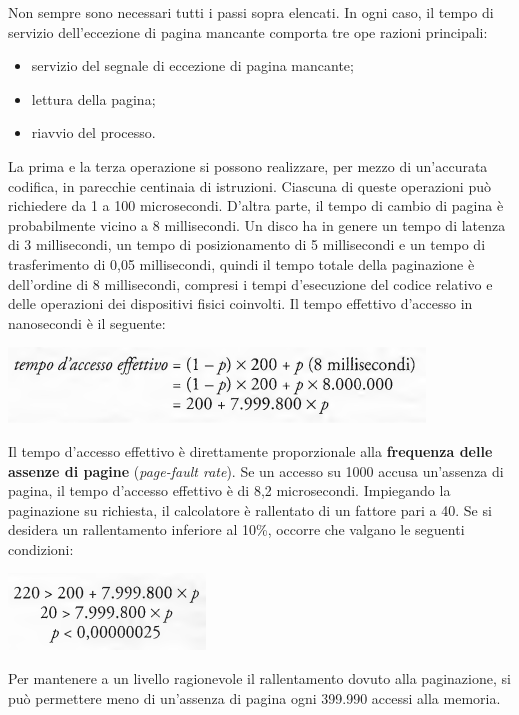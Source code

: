 \documentclass[11pt,a4paper]{article}
\begin{document}
Non sempre sono necessari tutti i passi sopra elencati.
In ogni caso, il tempo di servizio dell'eccezione di pagina mancante comporta tre ope­
razioni principali:
\begin{itemize}
  \item servizio del segnale di eccezione di pagina mancante;
  \item lettura della pagina;
  \item riavvio del processo.
\end{itemize}
La prima e la terza operazione si possono realizzare, per mezzo di un'accurata codifica, in pa­recchie centinaia di istruzioni. Ciascuna di queste operazioni può richiedere da 1 a 100 mi­crosecondi. D'altra parte, il tempo di cambio di pagina è probabilmente vicino a 8 millise­condi. Un disco ha in genere un tempo di latenza di 3 millisecondi, un tempo di posiziona­mento di 5 millisecondi e un tempo di trasferimento di 0,05 millisecondi, quindi il tempo totale della paginazione è dell'ordine di 8 millisecondi, compresi i tempi d'esecuzione del codice relativo e delle operazioni dei dispositivi fisici coinvolti.
Il tempo effettivo d'acces­so in nanosecondi è il seguente:
\begin{center}
  \includegraphics[scale=0.6]{img/0043.png}
\end{center}
Il tempo d'accesso effettivo è direttamente proporzionale alla \textbf{frequenza delle assenze di pa­gine} (\emph{page-fault rate}). Se un accesso su 1000 accusa un'assenza di pagina, il tempo d'accesso
effettivo è di 8,2 microsecondi. Impiegando la paginazione su richiesta, il calcolatore è ral­lentato di un fattore pari a 40. Se si desidera un rallentamento inferiore al 10\%, oc­corre che valgano le seguenti condizioni:
\begin{center}
  \includegraphics[scale=0.6]{img/0044.png}
\end{center}
Per mantenere a un livello ragionevole il rallentamento dovuto alla paginazione, si
può permettere meno di un'assenza di pagina ogni 399.990 accessi alla memoria.
\end{document}
